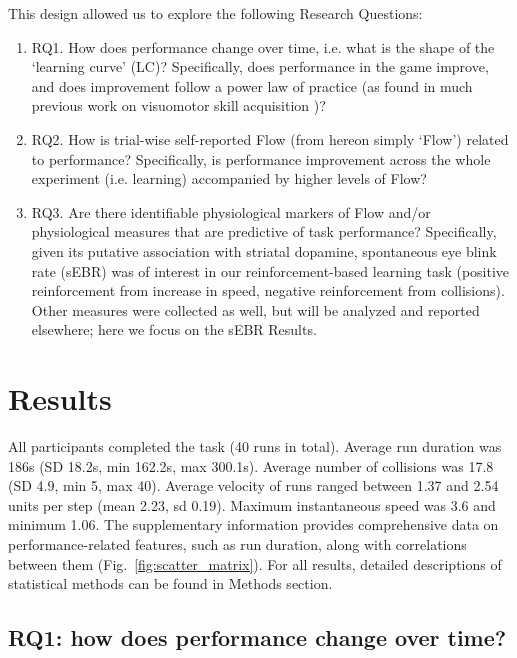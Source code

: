 \documentclass[fleqn,10pt]{wlscirep}
\begin{document}
This design allowed us to explore the following Research Questions:
\begin{enumerate}
	\item RQ1. How does performance change over time, i.e. what is the shape of the `learning curve' (LC)? Specifically, does performance in the game improve, and does improvement follow a power law of practice (as found in much previous work on visuomotor skill acquisition \cite{Newell1982})?

	\item RQ2. How is trial-wise self-reported Flow (from hereon simply `Flow') related to performance? Specifically, is performance improvement across the whole experiment (i.e. learning) accompanied by higher levels of Flow?

	\item RQ3. Are there identifiable physiological markers of Flow and/or physiological measures that are predictive of task performance? Specifically, given its putative association with striatal dopamine\cite{Slagter2012}, spontaneous eye blink rate (sEBR) was of interest in our reinforcement-based learning task (positive reinforcement from increase in speed, negative reinforcement from collisions). Other measures were collected as well, but will be analyzed and reported elsewhere; here we focus on the sEBR Results.

\end{enumerate}

\section*{Results}
All participants completed the task (40 runs in total). Average run duration was 186s (SD 18.2s, min 162.2s, max 300.1s). Average number of collisions was 17.8 (SD 4.9, min 5, max 40). Average velocity of runs ranged between 1.37 and 2.54 units per step (mean 2.23, sd 0.19). Maximum instantaneous speed was 3.6 and minimum 1.06. The supplementary information provides comprehensive data on performance-related features, such as run duration, along with correlations between them (Fig.~\ref{fig:scatter_matrix}). For all results, detailed descriptions of statistical methods can be found in Methods section.

\subsection*{RQ1: how does performance change over time?}
\end{document}

